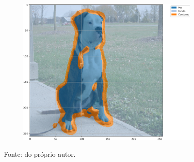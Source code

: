 \begin{figure}[H]
\begin{subfigure}[t]{0.32\textwidth}
         \label{results:fig:semantic:4.2}
     \end{subfigure}%
     ~ 
    \begin{subfigure}[t]{0.32\textwidth}
         \centering
         \includegraphics[width=1\linewidth]{recursos/imagens/results/max_acc_unet500_image_2_overlayed_segmentation.png}
         \label{results:fig:semantic:4.3}
     \end{subfigure}%

    Fonte: do próprio autor.
\end{figure}

